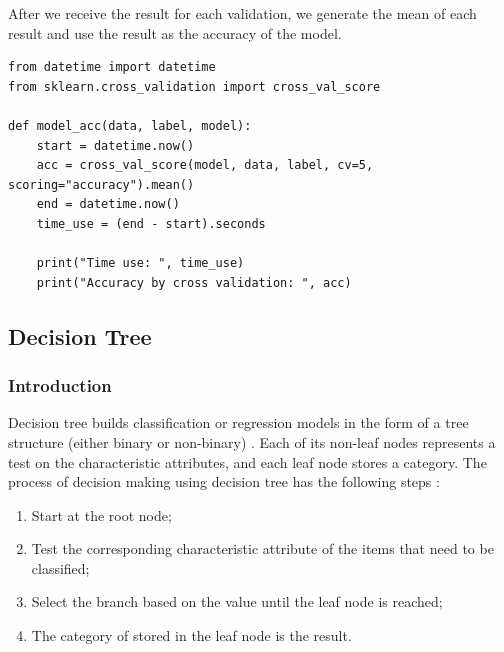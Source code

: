 \documentclass[sigconf]{acmart}
\begin{document}
After we receive the result for each validation, we generate the mean of each result and use the result as the accuracy of the model.

\begin{lstlisting}
from datetime import datetime
from sklearn.cross_validation import cross_val_score

def model_acc(data, label, model):
    start = datetime.now()
    acc = cross_val_score(model, data, label, cv=5, scoring="accuracy").mean()
    end = datetime.now()
    time_use = (end - start).seconds
    
    print("Time use: ", time_use)
    print("Accuracy by cross validation: ", acc)
\end{lstlisting}

\subsection{Decision Tree}

\subsubsection{Introduction}

Decision tree builds classification or regression models in the form of a tree structure (either binary or non-binary) \cite{ss.dt}. Each of its non-leaf nodes represents a test on the characteristic attributes, and each leaf node stores a category. The process of decision making using decision tree has the following steps \cite{intro.dm}:
\begin{enumerate}
    \item Start at the root node;
    \item Test the corresponding characteristic attribute of the items that need to be classified;
    \item Select the branch based on the value until the leaf node is reached;
    \item The category of stored in the leaf node is the result.
\end{enumerate}
\end{document}
